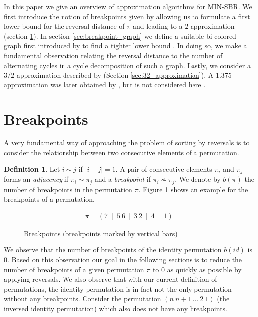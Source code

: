 \documentclass[11pt,DIV=11]{scrartcl}
\theoremstyle{definition}
\newtheorem{definition}[theorem]{Definition}
\theoremstyle{remark}
\begin{document}
In this paper we give an overview of approximation algorithms for MIN-SBR. We first introduce the notion of breakpoints given by \citeauthor*{Kececioglu1995} allowing us to formulate a first lower bound for the reversal distance of $\pi$ and leading to a $2$-approximation \cite{Kececioglu1995} (section \ref{sec:breakpoints}). In section \ref{sec:breakpoint_graph} we define a suitable bi-colored graph first introduced by \citeauthor*{Bafna1996} to find a tighter lower bound \cite{Bafna1996}. In doing so, we make a fundamental observation relating the reversal distance to the number of alternating cycles in a cycle decomposition of such a graph. Lastly, we consider a $3/2$-approximation described by \citeauthor{Christie1998} \cite{Christie1998} (Section \ref{sec:32_approximation}). A $1.375$-approximation was later obtained by \citeauthor*{Berman2001}, but is not considered here \cite{Berman2001}.

\section{Breakpoints}
\label{sec:breakpoints}

A very fundamental way of approaching the problem of sorting by reversals is to consider the relationship between two consecutive elements of a permutation.

\begin{definition}
Let $i \sim j$ if $|i - j| = 1$. A pair of consecutive elements $\pi_i$ and $\pi_j$ forms an \textit{adjacency} if $\pi_i \sim \pi_j$ and a \textit{breakpoint} if $\pi_i \not\sim \pi_j$. We denote by $b(\pi)$ the number of breakpoints in the permutation $\pi$. Figure \ref{fig:breakpoints} shows an example for the breakpoints of a permutation.
\end{definition}

\begin{figure}
    \begin{align*}
        \pi = (7\ \mid\ 5\ 6\ \mid\ 3\ 2\ \mid\ 4\ \mid\ 1)
    \end{align*}
    \caption{Breakpoints (breakpoints marked by vertical bars)}
    \label{fig:breakpoints}
\end{figure}

We observe that the number of breakpoints of the identity permutation $b(id)$ is $0$. Based on this observation our goal in the following sections is to reduce the number of breakpoints of a given permutation $\pi$ to $0$ as quickly as possible by applying reversals. We also observe that with our current definition of permutations, the identity permutation is in fact not the only permutation without any breakpoints. Consider the permutation $(n\ n+1\ \dots\ 2\ 1)$ (the inversed identity permutation) which also does not have any breakpoints.
\end{document}
